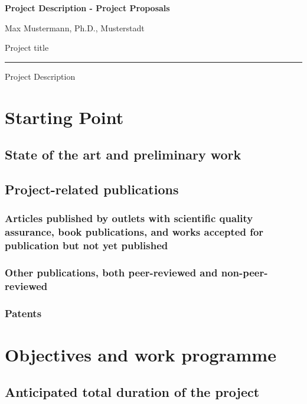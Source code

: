 \documentclass{scrartcl}
\newcommand{\applicants}{Max Mustermann, Ph.D., Musterstadt}
\newcommand{\project}{Project title}
\begin{document}
{\raggedright{} \normalsize \bfseries 
	Project Description - Project Proposals \par
	\applicants{} \par
	\project{} \par
	\rule{\textwidth}{0.5pt} \par
	Project Description
}


\section{Starting Point}

\subsection{State of the art and preliminary work}

\subsection{Project-related publications}

\subsubsection{Articles published by outlets with scientific quality assurance, book publications, and works accepted for publication but not yet published}
\printbibliography[category=reviewed, heading=none]

\subsubsection{Other publications, both peer-reviewed and non-peer-reviewed}
\printbibliography[category=nonreviewed, heading=none]

\subsubsection{Patents}

\printbibliography[category=patents_pending, heading=none]

\printbibliography[category=patents, heading=none]


\section{Objectives and work programme}

\subsection{Anticipated total duration of the project}
\end{document}
